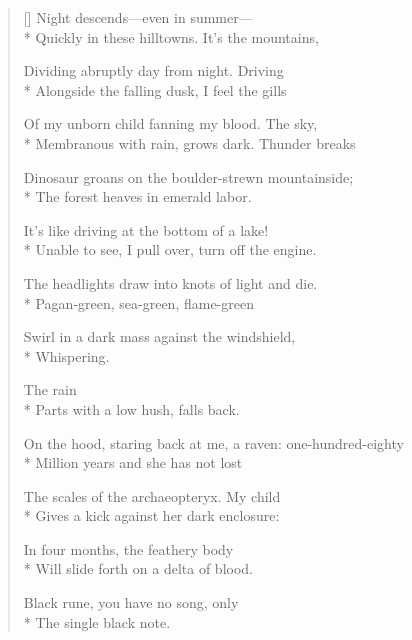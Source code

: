 \label{ch:adar_rhiannon}
\settowidth{\versewidth}{On the hood, staring back at me, a raven: one-hundred-eighty}
\begin{verse}[\versewidth]
 \qquad Night descends---even in summer---\\*
Quickly in these hilltowns.  It's the mountains,

Dividing abruptly day from night.  Driving\\*
Alongside the falling dusk, I feel the gills 

Of my unborn child fanning my blood.  The sky,\\*
Membranous with rain, grows dark.  Thunder breaks

Dinosaur groans on the boulder-strewn mountainside;\\*
The forest heaves in emerald labor.

It's like driving at the bottom of a lake!\\*
Unable to see, I pull over, turn off the engine.

The headlights draw into knots of light and die.\\*
Pagan-green, sea-green, flame-green

Swirl in a dark mass against the windshield,\\*
Whispering.

 \qquad  \qquad  \qquad The rain\\*
Parts with a low hush, falls back.

On the hood, staring back at me, a raven: one-hundred-eighty\\*
Million years and she has not lost

The scales of the archaeopteryx.  My child\\*
Gives a kick against her dark enclosure:

In four months, the feathery body\\*
Will slide forth on a delta of blood.

Black rune, you have no song, only\\*
The single black note.
\end{verse}
